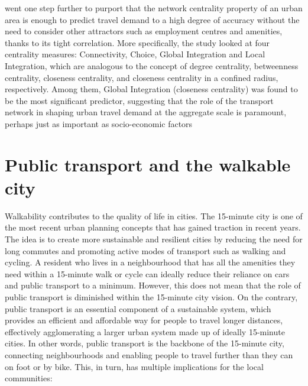 \citet{jayasingheApplicationDevelopingCountries2017} went one step further to purport that the network centrality property of an urban area is enough to predict travel demand to a high degree of accuracy without the need to consider other attractors such as employment centres and amenities, thanks to its tight correlation. More specifically, the study looked at four centrality measures: Connectivity, Choice, Global Integration and Local Integration, which are analogous to the concept of degree centrality, betweenness centrality, closeness centrality, and closeness centrality in a confined radius, respectively. Among them, Global Integration (closeness centrality) was found to be the most significant predictor, suggesting that the role of the transport network in shaping urban travel demand at the aggregate scale is paramount, perhaps just as important as socio-economic factors \citep{converyDeterminantsTransportMode2019}

\section{Public transport and the walkable city}

Walkability contributes to the quality of life in cities. The 15-minute city is one of the most recent urban planning concepts that has gained traction in recent years. The idea is to create more sustainable and resilient cities by reducing the need for long commutes and promoting active modes of transport such as walking and cycling. A resident who lives in a neighbourhood that has all the amenities they need within a 15-minute walk or cycle can ideally reduce their reliance on cars and public transport to a minimum. However, this does not mean that the role of public transport is diminished within the 15-minute city vision. On the contrary, public transport is an essential component of a sustainable system, which provides an efficient and affordable way for people to travel longer distances, effectively agglomerating a larger urban system made up of ideally 15-minute cities. In other words, public transport is the backbone of the 15-minute city, connecting neighbourhoods and enabling people to travel further than they can on foot or by bike. This, in turn, has multiple implications for the local communities:

